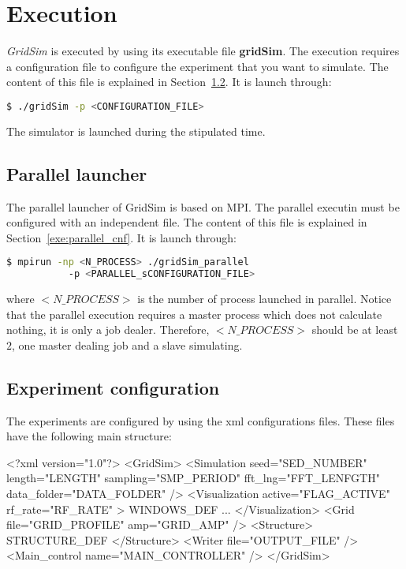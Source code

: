\chapter{Execution}
\label{chap:execution}

{\it GridSim} is executed by using its executable file {\bf gridSim}.
The execution requires a configuration file to configure the experiment that you want to simulate.
The content of this file is explained in Section~\ref{exe:single_cnf}.
It is launch through:
\begin{lstlisting}[language=bash]
  $ ./gridSim -p <CONFIGURATION_FILE>
\end{lstlisting}
\noindent
The simulator is launched during the stipulated time.


%
\section{Parallel launcher}

The parallel launcher of GridSim is based on MPI.
The parallel executin must be configured with an independent file.
The content of this file is explained in Section~\ref{exe:parallel_cnf}.
It is launch through:
\begin{lstlisting}[language=bash]
  $ mpirun -np <N_PROCESS> ./gridSim_parallel 
           -p <PARALLEL_sCONFIGURATION_FILE>
\end{lstlisting}
where $<N\_PROCESS>$ is the number of process launched in parallel.
Notice that the parallel execution requires a master process which does not calculate nothing, it is only a job dealer.
Therefore, $<N\_PROCESS>$ should be at least $2$, one master dealing job and a slave simulating.

%
\section{Experiment configuration}
\label{exe:single_cnf}

%
The experiments are configured by using the xml configurations files.
These files have the following main structure:
%
\begin{code}
<?xml version="1.0"?>
<GridSim>
	<Simulation 
		seed="SED_NUMBER" 
		length="LENGTH" 
		sampling="SMP_PERIOD" 
		fft_lng="FFT_LENFGTH" 
		data_folder="DATA_FOLDER"
	/>
	<Visualization 
		active="FLAG_ACTIVE" 
		rf_rate="RF_RATE" >
		WINDOWS_DEF			
		...									
	</Visualization>
	<Grid 
		file="GRID_PROFILE" 
		amp="GRID_AMP"
	/>
	<Structure> 
		STRUCTURE_DEF
	</Structure>
	<Writer file="OUTPUT_FILE" />
	<Main_control name="MAIN_CONTROLLER" />
</GridSim>
\end{code} 

